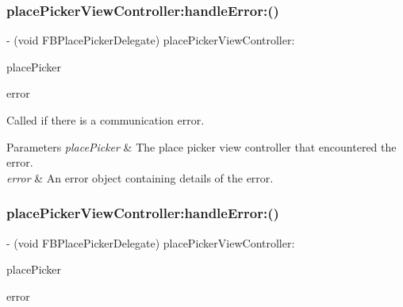 \subsubsection{\texorpdfstring{place\+Picker\+View\+Controller\+:handle\+Error\+:()}{placePickerViewController:handleError:()}\hspace{0.1cm}{\footnotesize\ttfamily [4/5]}}
{\footnotesize\ttfamily -\/ (void F\+B\+Place\+Picker\+Delegate) place\+Picker\+View\+Controller\+: \begin{DoxyParamCaption}\item[{(\hyperlink{interfaceFBPlacePickerViewController}{F\+B\+Place\+Picker\+View\+Controller} $\ast$)}]{place\+Picker }\item[{handleError:(N\+S\+Error $\ast$)}]{error }\end{DoxyParamCaption}\hspace{0.3cm}{\ttfamily [optional]}}

Called if there is a communication error.


\begin{DoxyParams}{Parameters}
{\em place\+Picker} & The place picker view controller that encountered the error. \\
\hline
{\em error} & An error object containing details of the error. \\
\hline
\end{DoxyParams}
\mbox{\label{protocolFBPlacePickerDelegate_01-p_a5a050442be2188ad3b2b04aa977577a4}} 
\subsubsection{\texorpdfstring{place\+Picker\+View\+Controller\+:handle\+Error\+:()}{placePickerViewController:handleError:()}\hspace{0.1cm}{\footnotesize\ttfamily [5/5]}}
{\footnotesize\ttfamily -\/ (void F\+B\+Place\+Picker\+Delegate) place\+Picker\+View\+Controller\+: \begin{DoxyParamCaption}\item[{(\hyperlink{interfaceFBPlacePickerViewController}{F\+B\+Place\+Picker\+View\+Controller} $\ast$)}]{place\+Picker }\item[{handleError:(N\+S\+Error $\ast$)}]{error }\end{DoxyParamCaption}\hspace{0.3cm}{\ttfamily [optional]}}

